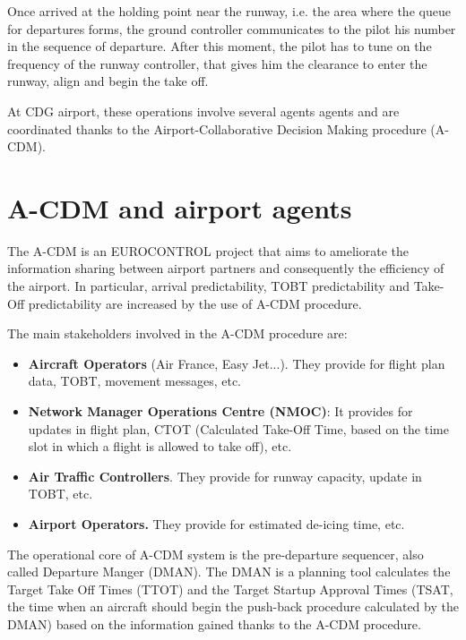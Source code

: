 \documentclass{article}
\begin{document}
Once arrived at the holding point near the runway, i.e. the area where the queue for departures forms, the ground controller communicates to the pilot his number in the sequence of departure. After this moment, the pilot has to tune on the frequency of the runway controller, that gives him the clearance to enter the runway, align and begin the take off.


At CDG airport, these operations involve several agents agents and are coordinated thanks to the Airport-Collaborative Decision Making procedure (A-CDM). 

\section{A-CDM and airport agents}\label{ACDM}
The A-CDM is an EUROCONTROL project that aims to ameliorate the information sharing between airport partners and consequently the efficiency of the airport. In particular, arrival predictability, TOBT predictability and Take-Off predictability are increased by the use of A-CDM procedure\cite{ACDMimpact}.

The main stakeholders involved in the A-CDM procedure are:
\begin{itemize}
	\item \textbf{Aircraft Operators} (Air France, Easy Jet...). They provide for flight plan data, TOBT, movement messages, etc.
	\item \textbf{Network Manager Operations Centre (NMOC)}: It provides for updates in flight plan, CTOT (Calculated Take-Off Time, based on the time slot in which a flight is allowed to take off), etc.
	\item \textbf{Air Traffic Controllers}. They provide for runway capacity, update in TOBT, etc.
	\item\textbf{Airport Operators.} They provide for estimated de-icing time, etc.
\end{itemize}

The operational core of A-CDM system is the pre-departure sequencer, also called Departure Manger (DMAN). The DMAN is a planning tool calculates the Target Take Off Times (TTOT) and the Target Startup Approval Times (TSAT, the time when an aircraft should begin the push-back procedure calculated by the DMAN) based on the information gained thanks to the A-CDM procedure.
\end{document}
